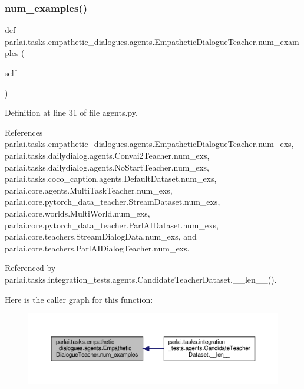 \subsubsection{\texorpdfstring{num\+\_\+examples()}{num\_examples()}}
{\footnotesize\ttfamily def parlai.\+tasks.\+empathetic\+\_\+dialogues.\+agents.\+Empathetic\+Dialogue\+Teacher.\+num\+\_\+examples (\begin{DoxyParamCaption}\item[{}]{self }\end{DoxyParamCaption})}



Definition at line 31 of file agents.\+py.



References parlai.\+tasks.\+empathetic\+\_\+dialogues.\+agents.\+Empathetic\+Dialogue\+Teacher.\+num\+\_\+exs, parlai.\+tasks.\+dailydialog.\+agents.\+Convai2\+Teacher.\+num\+\_\+exs, parlai.\+tasks.\+dailydialog.\+agents.\+No\+Start\+Teacher.\+num\+\_\+exs, parlai.\+tasks.\+coco\+\_\+caption.\+agents.\+Default\+Dataset.\+num\+\_\+exs, parlai.\+core.\+agents.\+Multi\+Task\+Teacher.\+num\+\_\+exs, parlai.\+core.\+pytorch\+\_\+data\+\_\+teacher.\+Stream\+Dataset.\+num\+\_\+exs, parlai.\+core.\+worlds.\+Multi\+World.\+num\+\_\+exs, parlai.\+core.\+pytorch\+\_\+data\+\_\+teacher.\+Parl\+A\+I\+Dataset.\+num\+\_\+exs, parlai.\+core.\+teachers.\+Stream\+Dialog\+Data.\+num\+\_\+exs, and parlai.\+core.\+teachers.\+Parl\+A\+I\+Dialog\+Teacher.\+num\+\_\+exs.



Referenced by parlai.\+tasks.\+integration\+\_\+tests.\+agents.\+Candidate\+Teacher\+Dataset.\+\_\+\+\_\+len\+\_\+\+\_\+().

Here is the caller graph for this function\+:
\nopagebreak
\begin{figure}[H]
\begin{center}
\leavevmode
\includegraphics[width=350pt]{classparlai_1_1tasks_1_1empathetic__dialogues_1_1agents_1_1EmpatheticDialogueTeacher_ab6f8d6b5343bd3e535c02d64c194414e_icgraph}
\end{center}
\end{figure}
\mbox{\label{classparlai_1_1tasks_1_1empathetic__dialogues_1_1agents_1_1EmpatheticDialogueTeacher_ad98fc90e215e507730a5e91c52f6378c}} 
